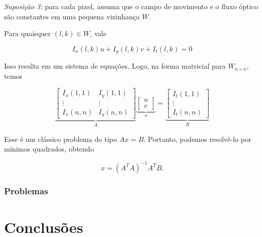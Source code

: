 \documentclass[12pt, a4paper]{article}
\begin{document}
\textit{Suposição 3:} para cada pixel, assuma que o campo de movimento e o fluxo óptico são constantes em uma pequena vizinhança $W$.

Para quaisquer $(l,k) \in W$, vale

\[ I_x(l,k) u + I_y(l,k) v + I_t(l,k)  = 0 \]

Isso resulta em um sistema de equações. Logo, na forma matricial para $W_{n\times n}$, temos

\[
\underbrace{
\begin{bmatrix}
I_x(1,1) & I_y(1,1) \\
\vdots & \vdots \\
I_x(n,n) & I_y(n,n)
\end{bmatrix}
}_{A}
\underbrace{
\begin{bmatrix}
u \\
v
\end{bmatrix}
}_{x}
=
\underbrace{
\begin{bmatrix}
I_t(1,1) \\
\vdots \\
I_t(n,n)
\end{bmatrix}
}_{B}
\]

Esse é um clássico problema do tipo $Ax=B$. Portanto, podemos resolvê-lo por mínimos quadrados, obtendo

\[
x = (A^T A)^{-1}A^TB.
\]

\subsubsection{Problemas}


\section{Conclusões}




\end{document}
